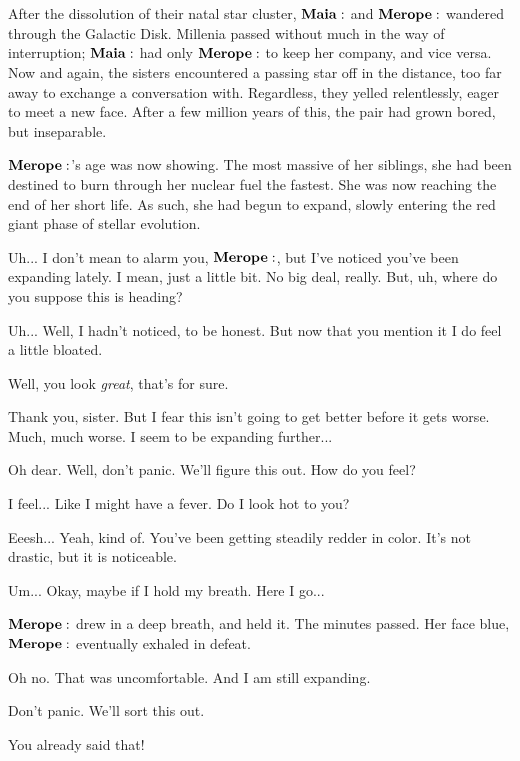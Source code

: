 \section{}

After the dissolution of their natal star cluster, $\Maia$ and $\Merope$ wandered through the Galactic Disk.  Millenia passed without much in the way of interruption; $\Maia$ had only $\Merope$ to keep her company, and vice versa.  Now and again, the sisters encountered a passing star off in the distance, too far away to exchange a conversation with.  Regardless, they yelled relentlessly, eager to meet a new face.  After a few million years of this, the pair had grown bored, but inseparable.

$\Merope$'s age was now showing.  The most massive of her siblings, she had been destined to burn through her nuclear fuel the fastest.  She was now reaching the end of her short life.  As such, she had begun to expand, slowly entering the red giant phase of stellar evolution.  

\Maia Uh... I don't mean to alarm you, $\Merope$, but I've noticed you've been expanding lately.  I mean, just a little bit.  No big deal, really.  But, uh, where do you suppose this is heading?

\Merope Uh... Well, I hadn't noticed, to be honest.  But now that you mention it I do feel a little bloated.  

\Maia Well, you look \textit{great}, that's for sure.

\Merope Thank you, sister.  But I fear this isn't going to get better before it gets worse.  Much, much worse.  I seem to be expanding further...

\Maia Oh dear.  Well, don't panic.  We'll figure this out.  How do you feel?

\Merope I feel... Like I might have a fever.  Do I look hot to you?

\Maia Eeesh... Yeah, kind of.  You've been getting steadily redder in color.  It's not drastic, but it is noticeable.

\Merope Um... Okay, maybe if I hold my breath.  Here I go...

$\Merope$ drew in a deep breath, and held it.  The minutes passed.  Her face blue, $\Merope$ eventually exhaled in defeat.  

\Merope Oh no.  That was uncomfortable.  And I am still expanding.

\Maia Don't panic.  We'll sort this out.

\Merope You already said that!

